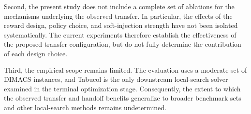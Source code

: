 Second, the present study does not include a complete set of ablations
for the mechanisms underlying the observed transfer. In particular,
the effects of the reward design, policy choice, and soft-injection
strength have not been isolated systematically. The current experiments
therefore establish the effectiveness of the proposed transfer
configuration, but do not fully determine the contribution of each
design choice.

Third, the empirical scope remains limited. The evaluation uses a
moderate set of DIMACS instances, and Tabucol is the only downstream
local-search solver examined in the terminal optimization stage.
Consequently, the extent to which the observed transfer and handoff
benefits generalize to broader benchmark sets and other local-search
methods remains undetermined.